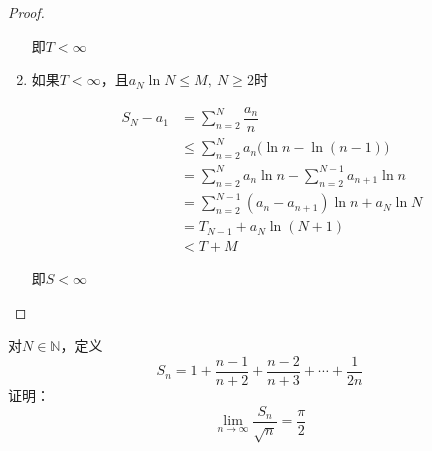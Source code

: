\begin{proof}
\begin{enumerate}
                即$T < \infty$

        \item 
                如果$T < \infty$，且$a_{N}\ln{N} \leq M,\ N \geq 2$时
                        
                \begin{align*}
                    S_N - a_1 &= \sum\limits_{n=2}^{N}{\dfrac{a_n}{n}} \\
                    & \leq \sum\limits_{n=2}^{N}{a_n\big(\ln{n} - \ln(n-1)\big)} \\
                    & = \sum\limits_{n=2}^{N}{a_n\ln{n}} - \sum\limits_{n=2}^{N-1}{a_{n+1}\ln{n}} \\
                    & = \sum\limits_{n=2}^{N-1}{(a_n - a_{n+1})\ln{n}} + a_N\ln{N} \\
                    & = T_{N-1} + a_N\ln{(N+1)} \\ 
                    & < T + M
                \end{align*}

                即$S < \infty$

     \end{enumerate}

\end{proof}

\begin{proposition}
    
    对$N \in \mathbb{N}$，定义
    $$ S_n = 1 + \dfrac{n-1}{n+2} +\dfrac{n-2}{n+3} + \cdots + \dfrac{1}{2n} $$
    证明：
    $$\lim\limits_{n\to\infty}{\dfrac{S_n}{\sqrt{n}}} = \dfrac{\pi}{2}$$

\end{proposition}


